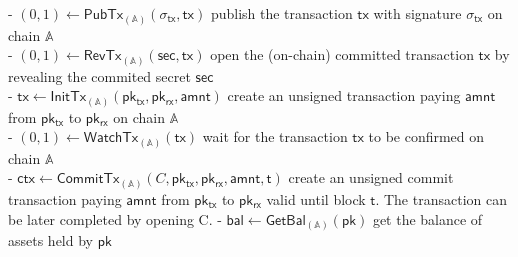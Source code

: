 \documentclass{article}      	%
\begin{document}
- $(0,1) \leftarrow \mathsf{PubTx}_{(\mathbb{A})}(\sigma_{\mathsf{tx}}, \mathsf{tx})$ publish the transaction $\mathsf{tx}$ with signature $\sigma_{\mathsf{tx}}$ on chain $\mathbb{A}$ \\
- $(0,1) \leftarrow \mathsf{RevTx}_{(\mathbb{A})}(\mathsf{sec}, \mathsf{tx})$ open the (on-chain) committed transaction $\mathsf{tx}$ by revealing the commited secret $\mathsf{sec}$ \\
- $\mathsf{tx} \leftarrow \mathsf{InitTx}_{(\mathbb{A})}(\mathsf{pk_{tx}}, \mathsf{pk_{rx}}, \mathsf{amnt})$ create an unsigned transaction paying $\mathsf{amnt}$ from $\mathsf{pk_{tx}}$ to $\mathsf{pk_{rx}}$ on chain $\mathbb{A}$ \\
- $(0,1) \gets \mathsf{WatchTx}_{(\mathbb{A})}(\mathsf{tx})$ wait for the transaction $\mathsf{tx}$ to be confirmed on chain $\mathbb{A}$ \\
- $\mathsf{ctx} \leftarrow \mathsf{CommitTx}_{(\mathbb{A})}(C, \mathsf{pk_{tx}}, \mathsf{pk_{rx}}, \mathsf{amnt}, \mathsf{t})$ create an unsigned commit transaction paying $\mathsf{amnt}$ from $\mathsf{pk_{tx}}$ to $\mathsf{pk_{rx}}$ valid until block $\mathsf{t}$. The transaction can be later completed by opening C.
- $\mathsf{bal} \gets \mathsf{GetBal}_{(\mathbb{A})}(\mathsf{pk})$ get the balance of assets held by $\mathsf{pk}$ \\

\\
\end{document}
